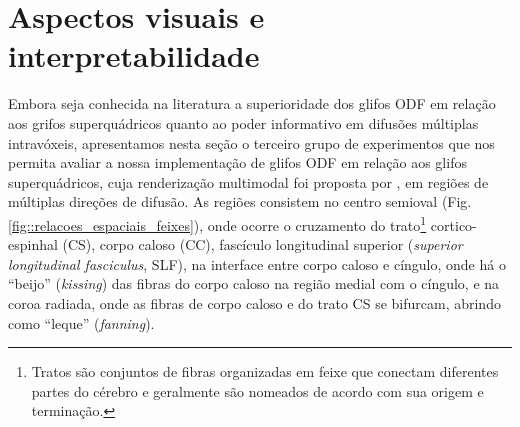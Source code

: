 \section{Aspectos visuais e interpretabilidade}
\label{sec::aspectos_visuais_e_interpretabilidade}



Embora seja conhecida na literatura a superioridade dos glifos ODF em relação aos grifos superquádricos quanto ao poder informativo em difusões múltiplas intravóxeis, apresentamos nesta seção o terceiro grupo de experimentos que nos permita avaliar a nossa implementação de glifos ODF em relação aos glifos superquádricos, cuja renderização multimodal foi proposta por , em regiões de múltiplas direções de difusão. As regiões consistem no centro semioval (Fig. \ref{fig::relacoes_espaciais_feixes}), onde ocorre o cruzamento do trato\footnote{Tratos são conjuntos de fibras organizadas em feixe que conectam diferentes partes do cérebro e geralmente são nomeados de acordo com sua origem e terminação.} cortico-espinhal (CS), corpo caloso (CC), fascículo longitudinal superior (\textit{superior longitudinal fasciculus}, SLF), na interface entre corpo caloso e cíngulo, onde há o ``beijo'' (\textit{kissing}) das fibras do corpo caloso na região medial com o cíngulo, e na coroa radiada, onde as fibras de corpo caloso e do trato CS se bifurcam, abrindo como ``leque'' (\textit{fanning}).

